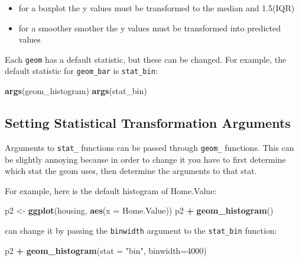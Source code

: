 \documentclass[]{book}
\newenvironment{Shaded}{\begin{snugshade}}{\end{snugshade}}
\newcommand{\KeywordTok}[1]{\textcolor[rgb]{0.13,0.29,0.53}{\textbf{#1}}}
\newcommand{\DataTypeTok}[1]{\textcolor[rgb]{0.13,0.29,0.53}{#1}}
\newcommand{\DecValTok}[1]{\textcolor[rgb]{0.00,0.00,0.81}{#1}}
\newcommand{\StringTok}[1]{\textcolor[rgb]{0.31,0.60,0.02}{#1}}
\newcommand{\OperatorTok}[1]{\textcolor[rgb]{0.81,0.36,0.00}{\textbf{#1}}}
\newcommand{\NormalTok}[1]{#1}
\providecommand{\tightlist}{%
  \setlength{\itemsep}{0pt}\setlength{\parskip}{0pt}}
\begin{document}
\begin{itemize}
\tightlist
\item
  for a boxplot the y values must be transformed to the median and
  1.5(IQR)
\item
  for a smoother smother the y values must be transformed into predicted
  values
\end{itemize}

Each \texttt{geom} has a default statistic, but these can be changed.
For example, the default statistic for \texttt{geom\_bar} is
\texttt{stat\_bin}:

\begin{Shaded}
\begin{Highlighting}[]
\KeywordTok{args}\NormalTok{(geom_histogram)}
\KeywordTok{args}\NormalTok{(stat_bin)}
\end{Highlighting}
\end{Shaded}

\subsection{Setting Statistical Transformation
Arguments}\label{setting-statistical-transformation-arguments}

Arguments to \texttt{stat\_} functions can be passed through
\texttt{geom\_} functions. This can be slightly annoying because in
order to change it you have to first determine which stat the geom uses,
then determine the arguments to that stat.

For example, here is the default histogram of Home.Value:

\begin{Shaded}
\begin{Highlighting}[]
\NormalTok{p2 <-}\StringTok{ }\KeywordTok{ggplot}\NormalTok{(housing, }\KeywordTok{aes}\NormalTok{(}\DataTypeTok{x =}\NormalTok{ Home.Value))}
\NormalTok{p2 }\OperatorTok{+}\StringTok{ }\KeywordTok{geom_histogram}\NormalTok{()}
\end{Highlighting}
\end{Shaded}

can change it by passing the \texttt{binwidth} argument to the
\texttt{stat\_bin} function:

\begin{Shaded}
\begin{Highlighting}[]
\NormalTok{p2 }\OperatorTok{+}\StringTok{ }\KeywordTok{geom_histogram}\NormalTok{(}\DataTypeTok{stat =} \StringTok{"bin"}\NormalTok{, }\DataTypeTok{binwidth=}\DecValTok{4000}\NormalTok{)}
\end{Highlighting}
\end{Shaded}
\end{document}
